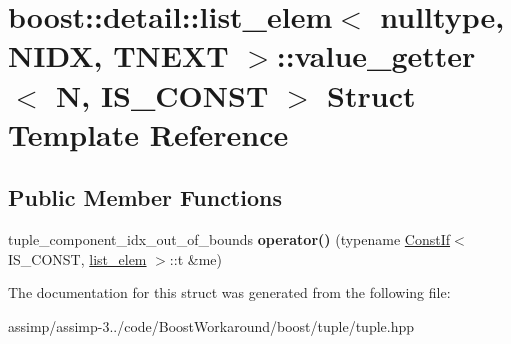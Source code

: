 \hypertarget{structboost_1_1detail_1_1list__elem_3_01nulltype_00_01_n_i_d_x_00_01_t_n_e_x_t_01_4_1_1value__getter}{\section{boost\+:\+:detail\+:\+:list\+\_\+elem$<$ nulltype, N\+I\+D\+X, T\+N\+E\+X\+T $>$\+:\+:value\+\_\+getter$<$ N, I\+S\+\_\+\+C\+O\+N\+S\+T $>$ Struct Template Reference}
\label{structboost_1_1detail_1_1list__elem_3_01nulltype_00_01_n_i_d_x_00_01_t_n_e_x_t_01_4_1_1value__getter}
}
\subsection*{Public Member Functions}
\begin{DoxyCompactItemize}
\item 
\hypertarget{structboost_1_1detail_1_1list__elem_3_01nulltype_00_01_n_i_d_x_00_01_t_n_e_x_t_01_4_1_1value__getter_a5954b3d69fc5e8fcddd264528e2ee1ac}{tuple\+\_\+component\+\_\+idx\+\_\+out\+\_\+of\+\_\+bounds {\bfseries operator()} (typename \hyperlink{structboost_1_1detail_1_1_const_if}{Const\+If}$<$ I\+S\+\_\+\+C\+O\+N\+S\+T, \hyperlink{structboost_1_1detail_1_1list__elem}{list\+\_\+elem} $>$\+::t \&me)}\label{structboost_1_1detail_1_1list__elem_3_01nulltype_00_01_n_i_d_x_00_01_t_n_e_x_t_01_4_1_1value__getter_a5954b3d69fc5e8fcddd264528e2ee1ac}

\end{DoxyCompactItemize}


The documentation for this struct was generated from the following file\+:\begin{DoxyCompactItemize}
\item 
assimp/assimp-\/3../code/\+Boost\+Workaround/boost/tuple/tuple.\+hpp\end{DoxyCompactItemize}
